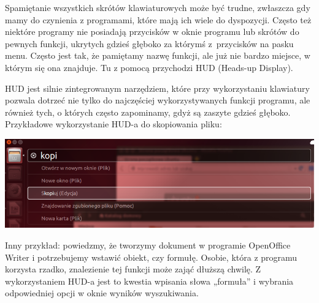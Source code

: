 Spamiętanie wszystkich skrótów klawiaturowych może być trudne, zwłaszcza gdy mamy do czynienia z programami, które mają ich wiele do dyspozycji. Często też niektóre programy nie posiadają przycisków w oknie programu lub skrótów do pewnych funkcji, ukrytych gdzieś głęboko za którymś z~przycisków na pasku menu. Często jest tak, że pamiętamy nazwę funkcji, ale już nie bardzo miejsce, w którym się ona znajduje. Tu z pomocą przychodzi \textcolor{ubuntu_orange}{HUD} (Heads-up Display).

HUD jest silnie zintegrowanym narzędziem, które przy wykorzystaniu klawiatury pozwala dotrzeć nie tylko do najczęściej wykorzystywanych funkcji programu, ale również tych, o których często zapominamy, gdyż są zaszyte gdzieś głęboko. Przykładowe wykorzystanie HUD-a do skopiowania pliku:

\begin{center}
	\includegraphics[width=\linewidth]{images/unity_hud1.png}
\end{center}

Inny przykład: powiedzmy, że tworzymy dokument w programie OpenOffice Writer i potrzebujemy wstawić obiekt, czy formułę. Osobie, która z programu korzysta rzadko, znalezienie tej funkcji może zająć dłuższą chwilę. Z wykorzystaniem HUD-a jest to kwestia wpisania słowa „formuła” i wybrania odpowiedniej opcji w oknie wyników wyszukiwania.
